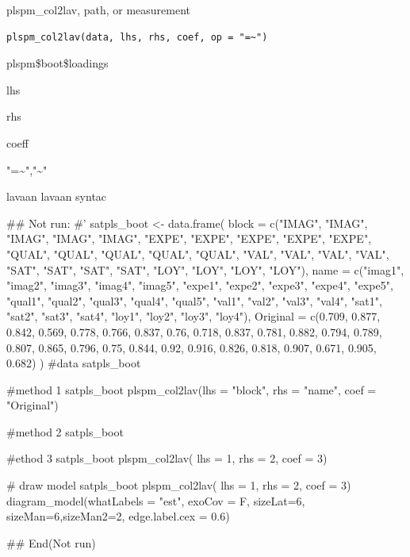 \documentclass[a4paper]{book}
\begin{document}
%
\begin{Description}
plspm\_col2lav, path, or measurement
\end{Description}
%
\begin{Usage}
\begin{verbatim}
plspm_col2lav(data, lhs, rhs, coef, op = "=~")
\end{verbatim}
\end{Usage}
%
\begin{Arguments}
\begin{ldescription}
\item[\code{data}] plspm\$boot\$loadings

\item[\code{lhs}] lhs

\item[\code{rhs}] rhs

\item[\code{coef}] coeff

\item[\code{op}] "=\textasciitilde{}","\textasciitilde{}"
\end{ldescription}
\end{Arguments}
%
\begin{Value}
lavaan lavaan syntac
\end{Value}
%
\begin{Examples}
\begin{ExampleCode}

\#\# Not run: 
#'
satpls_boot <- data.frame(
  block = c("IMAG", "IMAG", "IMAG",
  "IMAG", "IMAG", "EXPE", "EXPE",
  "EXPE", "EXPE", "EXPE", "QUAL",
  "QUAL", "QUAL", "QUAL", "QUAL",
  "VAL", "VAL", "VAL", "VAL", "SAT",
  "SAT", "SAT", "SAT", "LOY", "LOY",
  "LOY", "LOY"),
  name = c("imag1", "imag2", "imag3",
   "imag4", "imag5", "expe1", "expe2",
    "expe3", "expe4", "expe5", "qual1",
     "qual2", "qual3", "qual4", "qual5",
     "val1", "val2", "val3", "val4",
     "sat1", "sat2", "sat3", "sat4",
     "loy1", "loy2", "loy3", "loy4"),
  Original = c(0.709, 0.877, 0.842,
   0.569, 0.778, 0.766, 0.837, 0.76,
   0.718, 0.837, 0.781, 0.882, 0.794,
    0.789, 0.807, 0.865, 0.796, 0.75,
    0.844, 0.92, 0.916, 0.826, 0.818,
     0.907, 0.671, 0.905, 0.682)
)
#data
satpls_boot

#method 1
satpls_boot %
plspm_col2lav(lhs = "block", rhs = "name", coef = "Original")

#method 2
satpls_boot %

#ethod 3
satpls_boot %
plspm_col2lav( lhs = 1, rhs = 2, coef = 3)

# draw model
satpls_boot %
plspm_col2lav( lhs = 1, rhs = 2, coef = 3)%
  diagram_model(whatLabels = "est", exoCov = F,
  sizeLat=6, sizeMan=6,sizeMan2=2,
                edge.label.cex = 0.6)



## End(Not run)

\end{ExampleCode}
\end{Examples}
\end{document}
